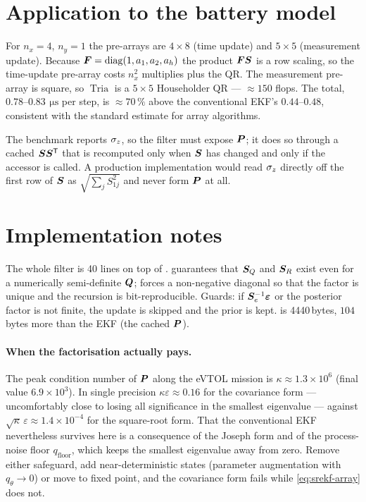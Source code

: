 \section{Application to the battery model}
For $n_x=4$, $n_y=1$ the pre-arrays are $4\times8$ (time update) and $5\times5$ (measurement
update). Because $\bm{F} = \operatorname{diag}(1,a_1,a_2,a_h)$ the product $\bm{F}\bm{S}$ is a row scaling, so the
time-update pre-array costs $n_x^2$ multiplies plus the QR. The measurement pre-array is
square, so $\operatorname{Tria}$ is a $5\times5$ Householder QR --- $\approx 150$ flops. The
total, $0.78$--$0.83\,\SI{}{\micro\second}$ per step, is $\approx 70\,\%$ above the
conventional EKF's $0.44$--$0.48$, consistent with the standard estimate for array
algorithms.

The benchmark reports $\sigma_z$, so the filter must expose $\bm{P}$; it does so through a
cached $\bm{S}\bm{S}^{\mathsf{T}}$ that is recomputed only when $\bm{S}$ has changed and only if the accessor is
called. A production implementation would read $\sigma_z$ directly off the first row of
$\bm{S}$ as $\sqrt{\sum_j S_{1j}^2}$ and never form $\bm{P}$ at all.

\section{Implementation notes}
The whole filter is 40 lines on top of .  guarantees that
$\bm{S}_Q$ and $\bm{S}_R$ exist even for a numerically semi-definite $\bm{Q}$;  forces a
non-negative diagonal so that the factor is unique and the recursion is bit-reproducible.
Guards: if $\bm{S}_e^{-1}\bm{\bm{\varepsilon}}$ or the posterior factor is not finite, the update is skipped
and the prior is kept.  is 4440\,bytes, $104$\,bytes more
than the EKF (the cached $\bm{P}$).

\paragraph{When the factorisation actually pays.} The peak condition number of $\bm{P}$ along
the eVTOL mission is $\kappa\approx1.3\times10^6$ (final value $6.9\times10^3$). In single
precision $\kappa\varepsilon\approx0.16$ for the covariance form --- uncomfortably close to
losing all significance in the smallest eigenvalue --- against
$\sqrt{\kappa}\,\varepsilon\approx1.4\times10^{-4}$ for the square-root form. That the
conventional EKF nevertheless survives here is a consequence of the Joseph form and of the
process-noise floor $q_{\text{floor}}$, which keeps the smallest eigenvalue away from zero.
Remove either safeguard, add near-deterministic states (parameter augmentation with
$q_\theta\to0$) or move to fixed point, and the covariance form fails while
\eqref{eq:srekf-array} does not.

